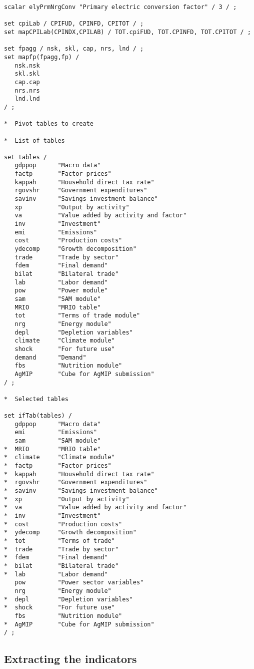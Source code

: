 \begin{lstlisting}[language=GAMS, caption={'Tab' file example for creating CSV cubes}, label=lst:tabOpt]
scalar elyPrmNrgConv "Primary electric conversion factor" / 3 / ;

set cpiLab / CPIFUD, CPINFD, CPITOT / ;
set mapCPILab(CPINDX,CPILAB) / TOT.cpiFUD, TOT.CPINFD, TOT.CPITOT / ;

set fpagg / nsk, skl, cap, nrs, lnd / ;
set mapfp(fpagg,fp) /
   nsk.nsk
   skl.skl
   cap.cap
   nrs.nrs
   lnd.lnd
/ ;

*  Pivot tables to create

*  List of tables

set tables /
   gdppop      "Macro data"
   factp       "Factor prices"
   kappah      "Household direct tax rate"
   rgovshr     "Government expenditures"
   savinv      "Savings investment balance"
   xp          "Output by activity"
   va          "Value added by activity and factor"
   inv         "Investment"
   emi         "Emissions"
   cost        "Production costs"
   ydecomp     "Growth decomposition"
   trade       "Trade by sector"
   fdem        "Final demand"
   bilat       "Bilateral trade"
   lab         "Labor demand"
   pow         "Power module"
   sam         "SAM module"
   MRIO        "MRIO table"
   tot         "Terms of trade module"
   nrg         "Energy module"
   depl        "Depletion variables"
   climate     "Climate module"
   shock       "For future use"
   demand      "Demand"
   fbs         "Nutrition module"
   AgMIP       "Cube for AgMIP submission"
/ ;

*  Selected tables

set ifTab(tables) /
   gdppop      "Macro data"
   emi         "Emissions"
   sam         "SAM module"
*  MRIO        "MRIO table"
*  climate     "Climate module"
*  factp       "Factor prices"
*  kappah      "Household direct tax rate"
*  rgovshr     "Government expenditures"
*  savinv      "Savings investment balance"
*  xp          "Output by activity"
*  va          "Value added by activity and factor"
*  inv         "Investment"
*  cost        "Production costs"
*  ydecomp     "Growth decomposition"
*  tot         "Terms of trade"
*  trade       "Trade by sector"
*  fdem        "Final demand"
*  bilat       "Bilateral trade"
*  lab         "Labor demand"
   pow         "Power sector variables"
   nrg         "Energy module"
*  depl        "Depletion variables"
*  shock       "For future use"
   fbs         "Nutrition module"
*  AgMIP       "Cube for AgMIP submission"
/ ;

\end{lstlisting}

\subsection{Extracting the indicators}

